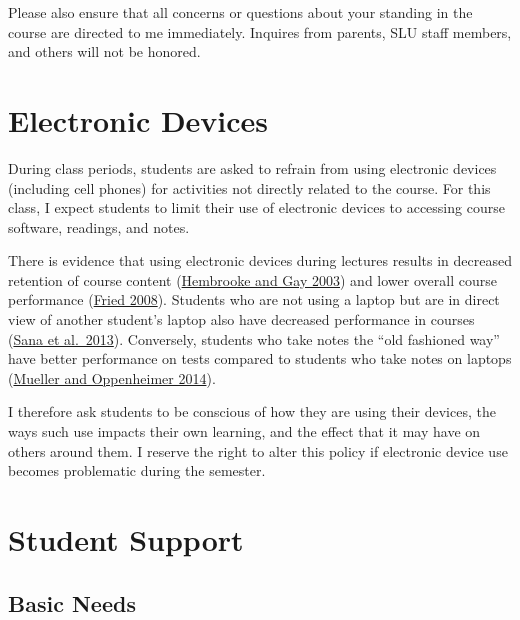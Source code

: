 \documentclass[
]{book}
\begin{document}
Please also ensure that all concerns or questions about your standing in the course are directed to me immediately. Inquires from parents, SLU staff members, and others will not be honored.

\hypertarget{electronic-devices}{%
\section{Electronic Devices}\label{electronic-devices}}

During class periods, students are asked to refrain from using electronic devices (including cell phones) for activities not directly related to the course. For this class, I expect students to limit their use of electronic devices to accessing course software, readings, and notes.

There is evidence that using electronic devices during lectures results in decreased retention of course content (\href{https://link.springer.com/article/10.1007/BF02940852}{Hembrooke and Gay 2003}) and lower overall course performance (\href{https://www.sciencedirect.com/science/article/pii/S0360131506001436}{Fried 2008}). Students who are not using a laptop but are in direct view of another student's laptop also have decreased performance in courses (\href{https://www.sciencedirect.com/science/article/pii/S0360131512002254}{Sana et al.~2013}). Conversely, students who take notes the ``old fashioned way'' have better performance on tests compared to students who take notes on laptops (\href{http://journals.sagepub.com/doi/abs/10.1177/0956797614524581}{Mueller and Oppenheimer 2014}).

I therefore ask students to be conscious of how they are using their devices, the ways such use impacts their own learning, and the effect that it may have on others around them. I reserve the right to alter this policy if electronic device use becomes problematic during the semester.

\hypertarget{student-support}{%
\section{Student Support}\label{student-support}}

\hypertarget{basic-needs}{%
\subsection{Basic Needs}\label{basic-needs}}
\end{document}
